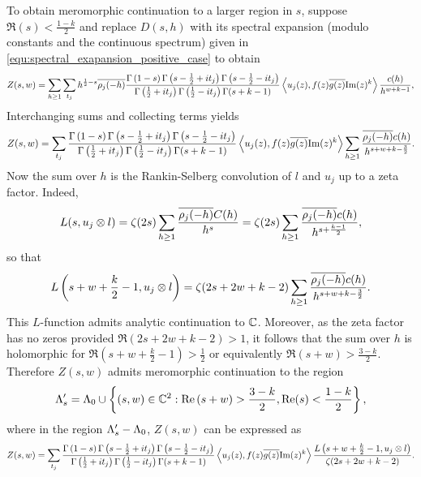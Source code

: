 \documentclass[12pt,reqno,oneside]{amsart}
\begin{document}
  To obtain meromorphic continuation to a larger region in $s$, suppose $\Re(s) < \frac{1-k}{2}$ and replace $D(s,h)$ with its spectral expansion (modulo constants and the continuous spectrum) given in \cref{equ:spectral_exapansion_positive_case} to obtain
  \[
    Z(s,w) = \sum_{h \ge 1}\sum_{t_{j}}h^{\frac{1}{2}-s}\overline{\rho_{j}(-h)}\frac{\Gamma\left(1-s\right)\Gamma\left(s-\frac{1}{2}+it_{j}\right)\Gamma\left(s-\frac{1}{2}-it_{j}\right)}{\Gamma\left(\frac{1}{2}+it_{j}\right)\Gamma\left(\frac{1}{2}-it_{j}\right)\Gamma(s+k-1)}\left\langle u_{j}(z),f(z)\overline{g(z)}\mathrm{Im}(z)^{k}\right\rangle\frac{c(h)}{h^{w+k-1}},
  \]
  Interchanging sums and collecting terms yields
  \[
    Z(s,w) = \sum_{t_{j}}\frac{\Gamma\left(1-s\right)\Gamma\left(s-\frac{1}{2}+it_{j}\right)\Gamma\left(s-\frac{1}{2}-it_{j}\right)}{\Gamma\left(\frac{1}{2}+it_{j}\right)\Gamma\left(\frac{1}{2}-it_{j}\right)\Gamma(s+k-1)}\left\langle u_{j}(z),f(z)\overline{g(z)}\mathrm{Im}(z)^{k}\right\rangle\sum_{h \ge 1}\frac{\overline{\rho_{j}(-h)}c(h)}{h^{s+w+k-\frac{3}{2}}}.
  \]
  Now the sum over $h$ is the Rankin-Selberg convolution of $l$ and $u_{j}$ up to a zeta factor. Indeed,
  \[
    L(s,u_{j} \otimes l) = \zeta(2s)\sum_{h \ge 1}\frac{\overline{\rho_{j}(-h)}C(h)}{h^{s}} = \zeta(2s)\sum_{h \ge 1}\frac{\overline{\rho_{j}(-h)}c(h)}{h^{s+\frac{k-1}{2}}},
  \]
  so that
  \[
    L\left(s+w+\frac{k}{2}-1,u_{j} \otimes l\right) = \zeta(2s+2w+k-2)\sum_{h \ge 1}\frac{\overline{\rho_{j}(-h)}c(h)}{h^{s+w+k-\frac{3}{2}}}.
  \]
  This $L$-function admits analytic continuation to $\mathbb{C}$. Moreover, as the zeta factor has no zeros provided $\Re(2s+2w+k-2) > 1$, it follows that the sum over $h$ is holomorphic for $\Re\left(s+w+\frac{k}{2}-1\right) > \frac{1}{2}$ or equivalently $\Re(s+w) > \frac{3-k}{2}$. Therefore $Z(s,w)$ admits meromorphic continuation to the region
  \[
    \Lambda_{s}' = \Lambda_{0} \cup \left\{(s,w) \in \mathbb{C}^{2}:\mathrm{Re}\left(s+w\right) > \frac{3-k}{2}, \mathrm{Re}(s) < \frac{1-k}{2}\right\},
  \]
  where in the region $\Lambda_{s}'-\Lambda_{0}$, $Z(s,w)$ can be expressed as
  \[
    Z(s,w) = \sum_{t_{j}}\frac{\Gamma\left(1-s\right)\Gamma\left(s-\frac{1}{2}+it_{j}\right)\Gamma\left(s-\frac{1}{2}-it_{j}\right)}{\Gamma\left(\frac{1}{2}+it_{j}\right)\Gamma\left(\frac{1}{2}-it_{j}\right)\Gamma(s+k-1)}\left\langle u_{j}(z),f(z)\overline{g(z)}\mathrm{Im}(z)^{k}\right\rangle\frac{L\left(s+w+\frac{k}{2}-1,u_{j} \otimes l\right)}{\zeta(2s+2w+k-2)}.
  \]
\end{document}

